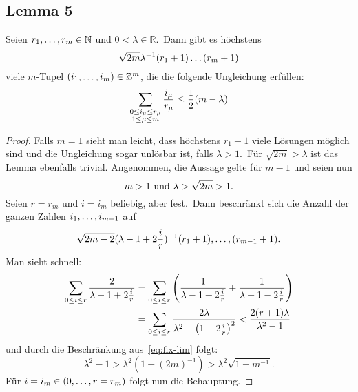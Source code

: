 \subsection{Lemma 5}
    \label{subsec:lemma5}
    \textrm{Seien $r_1, \dots, r_m \in \mathbb{N}$ und $0 < \lambda \in \mathbb{R}$.\ Dann gibt es höchstens}
    \begin{equation*}
        \sqrt{2m} \lambda^{-1} (r_1 + 1) \dots (r_m +1)
    \end{equation*}
    \textrm{viele $m$-Tupel $(i_1, \dots, i_m) \in \mathbb{Z}^m$, die die folgende Ungleichung erfüllen:}
    \begin{equation*}
        \sum_{\substack{0 \leq i_\mu \leq r_\mu \\ 1 \leq \mu \leq m}} \frac{i_\mu}{r_\mu} \leq \frac{1}{2} (m - \lambda)
    \end{equation*}
    \begin{proof}
        \textrm{Falls $m = 1$ sieht man leicht, dass höchstens $r_1 + 1$ viele Lösungen möglich sind und die Ungleichung
        sogar unlösbar ist, falls $\lambda > 1$.\ Für $\sqrt{2m} > \lambda$ ist das Lemma ebenfalls trivial.}
        \newline
        \textrm{Angenommen, die Aussage gelte für $m-1$ und seien nun}
        \begin{equation}
            m > 1 \ \textrm{und}\  \lambda > \sqrt{2m} > 1. \label{eq:sqrt-2m-ass}
        \end{equation}
        \textrm{Seien $r = r_m$ und $i = i_m$ beliebig, aber fest.\ Dann beschränkt sich die Anzahl der ganzen Zahlen
        $i_1, \dots, i_{m-1}$ auf}
        \begin{equation}
            \sqrt{2m - 2} (\lambda - 1 + 2 \frac{i}{r})^{-1}(r_1+1), \dots, (r_{m-1}+1). \label{eq:fix-lim}
        \end{equation}
        Man sieht schnell:
        \begin{align*}
            \sum_{0 \leq i \leq r} \frac{2}{\lambda - 1 + 2\frac{i}{r}} &= \sum_{0 \leq i \leq r} \left( \frac{1}{\lambda -
            1 + 2 \frac{i}{r}} + \frac{1}{\lambda + 1 - 2 \frac{i}{r}} \right) \\ &= \sum_{0 \leq i \leq r} \frac{2 \lambda}
            {\lambda^2 - \left( 1 - 2 \frac{i}{r} \right)^2} < \frac{2 (r + 1) \lambda}{\lambda^2 - 1}
        \end{align*}
        \textrm{und durch die Beschränkung aus~\ref{eq:fix-lim} folgt:}
        \begin{equation*}
            \lambda^2 - 1 > \lambda^2 (1 - (2m)^{-1}) > \lambda^2 \sqrt{1 - m^{-1}}.
        \end{equation*}
        \textrm{Für $i = i_m \in (0, \dots, r = r_m)$ folgt nun die Behauptung.}
    \end{proof}
    

